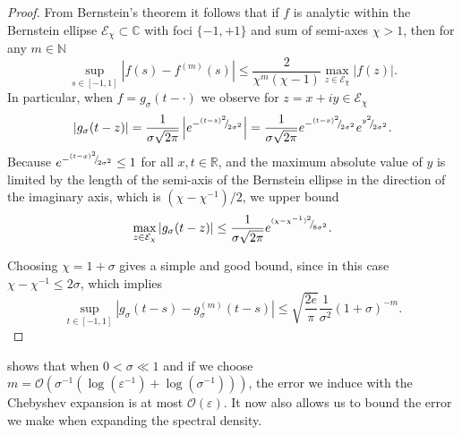 \documentclass[12pt]{article}
\begin{document}
\begin{proof}
    From Bernstein's theorem \cite[theorem 4.3]{trefethen-2008-gauss-quadrature} it follows that if $f$ is analytic within the Bernstein ellipse $\mathcal{E}_{\chi} \subset \mathbb{C}$ with foci $\{-1, +1\}$ and sum of semi-axes $\chi > 1$, then for any $m \in \mathbb{N}$
    \begin{equation}
        \sup_{s \in [-1, 1]} \left| f(s) - f^{(m)}(s) \right| \leq \frac{2}{\chi^m (\chi - 1)} \max_{z \in \mathcal{E}_{\chi}} |f(z)|.
        \label{equ:bernstein-bound}
    \end{equation}
    In particular, when $f = g_{\sigma}(t - \cdot)$ we observe for $z = x + iy \in \mathcal{E}_{\chi}$
    \begin{equation}
    | g_{\sigma}(t - z) | 
    = \frac{1}{\sigma \sqrt{2 \pi}} \left| e^{-{}^{(t - z)^2}{\mskip -5mu/\mskip -3mu}_{2\sigma^2}} \right|
    = \frac{1}{\sigma \sqrt{2 \pi}} e^{-{}^{(t - x)^2}{\mskip -5mu/\mskip -3mu}_{2\sigma^2}}e^{{}^{y^2}{\mskip -5mu/\mskip -3mu}_{2\sigma^2}}.
    \end{equation}
    Because $e^{-{}^{(t - x)^2}{\mskip -5mu/\mskip -3mu}_{2\sigma^2}} \leq 1$ for all $x, t \in \mathbb{R}$, and the maximum absolute value of $y$ is limited by the length of the semi-axis of the Bernstein ellipse in the direction of the imaginary axis, which is $(\chi - \chi^{-1}) / 2$, we upper bound
    \begin{equation}
        \max_{z \in \mathcal{E}_{\chi}} | g_{\sigma}(t - z) | 
        \leq \frac{1}{\sigma \sqrt{2 \pi}} e^{{}^{(\chi - \chi^{-1})^2}{\mskip -5mu/\mskip -3mu}_{8 \sigma^2}}.
    \end{equation}

    Choosing $\chi = 1 + \sigma$ gives a simple and good bound, since in this case $\chi - \chi^{-1} \leq 2\sigma$, which implies
    \begin{equation}
        \sup_{t \in [-1, 1]} \left| g_{\sigma}(t - s) - g_{\sigma}^{(m)}(t - s) \right| \leq \sqrt{\frac{2e}{\pi}} \frac{1}{\sigma^2} (1 + \sigma)^{-m}.
    \end{equation}
\end{proof}

 shows that when $0 < \sigma \ll 1$ and if we choose $m = \mathcal{O}(\sigma^{-1}(\log(\varepsilon^{-1}) + \log(\sigma^{-1})))$, the error we induce with the Chebyshev expansion is at most $\mathcal{O}(\varepsilon)$. It now also allows us to bound the error we make when expanding the spectral density.
\end{document}
